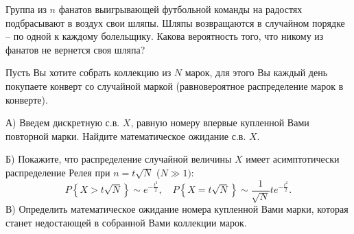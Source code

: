 \begin{problem}
Группа из $n$ фанатов выигрывающей футбольной команды на радостях 
подбрасывают в воздух свои шляпы. Шляпы возвращаются в случайном порядке -- 
по одной к каждому болельщику. Какова вероятность того, что никому из 
фанатов не вернется своя шляпа?
\end{problem}

\begin{problem}
Пусть Вы хотите собрать коллекцию из $N$ 
марок, для этого Вы каждый день покупаете конверт со случайной маркой 
(равновероятное распределение марок в конверте).

А) Введем дискретную с.в. $X$, равную номеру впервые купленной Вами 
повторной марки. Найдите математическое ожидание с.в. $X$.

Б) Покажите, что распределение случайной величины $X$ имеет асимптотически 
распределение Релея при $n=t\sqrt N $ ($N\gg 1)$:
\[
P\left\{ {X>t\sqrt N } \right\}\sim e^{-\frac{t^2}{2}},
\quad
P\left\{ {X=t\sqrt N } \right\}\sim \frac{1}{\sqrt N }te^{-\frac{t^2}{2}}.
\]
В) Определить математическое ожидание номера купленной Вами марки, которая 
станет недостающей в собранной Вами коллекции марок. 

\end{problem}

